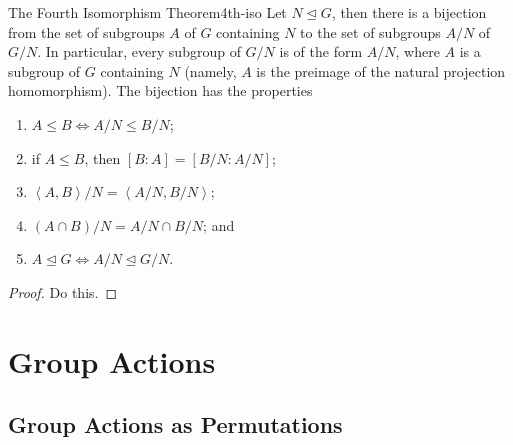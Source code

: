 \documentclass[10pt]{report}
\begin{document}
\begin{thrm}{The Fourth Isomorphism Theorem}{4th-iso}
	Let $N \trianglelefteq G$, then there is a bijection from the set of subgroups $A$ of $G$ containing $N$ to the set of subgroups $A/N$ of $G/N$. In particular, every subgroup of $G/N$ is of the form $A/N$, where $A$ is a subgroup of $G$ containing $N$ (namely, $A$ is the preimage of the natural projection homomorphism). The bijection has the properties
	\begin{enumerate}
		\item $A \leq B \iff A/N \leq B/N$;
		\item if $A \leq B$, then $[B:A] = [B/N:A/N]$;
		\item $\left\langle A,B \right\rangle/N = \left\langle A/N,B/N \right\rangle$;
		\item $(A \cap B)/N = A/N \cap B/N$; and
		\item $A \trianglelefteq G \iff A/N \trianglelefteq G/N$.
	\end{enumerate}
\end{thrm}
\begin{proof}
{\color{red}Do this.}
\end{proof}



\chapter{Group Actions}


\section{Group Actions as Permutations}
\end{document}
